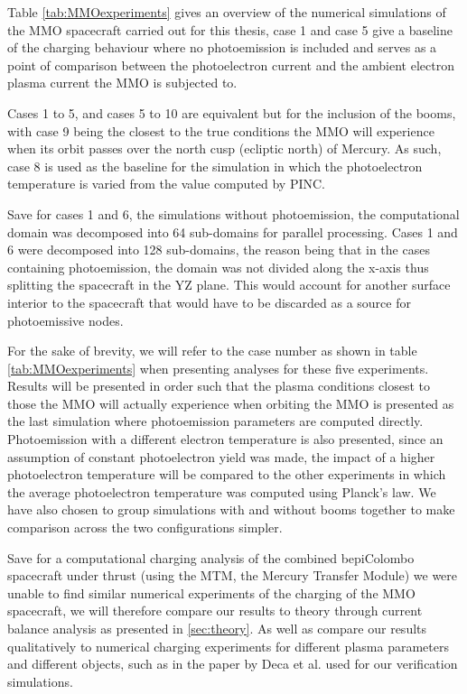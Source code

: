 Table \ref{tab:MMOexperiments} gives an overview of the numerical simulations of the MMO spacecraft carried out for this thesis, case 1 and case 5 give a baseline of the charging behaviour where no photoemission is included and serves as a point of comparison between the photoelectron current and the ambient electron plasma current the MMO is subjected to. 

Cases 1 to 5, and cases 5 to 10 are equivalent but for the inclusion of the booms, with case 9 being the closest to the true conditions the MMO will experience when its orbit passes over the north cusp (ecliptic north) of Mercury. As such, case 8 is used as the baseline for the simulation in which the photoelectron temperature is varied from the value computed by PINC.

Save for cases 1 and 6, the simulations without photoemission, the computational domain was decomposed into 64 sub-domains for parallel processing. Cases 1 and 6 were decomposed into 128 sub-domains, the reason being that in the cases containing photoemission, the domain was not divided along the x-axis thus splitting the spacecraft in the YZ plane. This would account for another surface interior to the spacecraft that would have to be discarded as a source for photoemissive nodes.

For the sake of brevity, we will refer to the case number as shown in table \ref{tab:MMOexperiments} when presenting analyses for these five experiments. Results will be presented in order such that the plasma conditions closest to those the MMO will actually experience when orbiting the MMO is presented as the last simulation where photoemission parameters are computed directly. Photoemission with a different electron temperature is also presented, since an assumption of constant photoelectron yield was made, the impact of a higher photoelectron temperature will be compared to the other experiments in which the average photoelectron temperature was computed using Planck's law. We have also chosen to group simulations with and without booms together to make comparison across the two configurations simpler.

Save for a computational charging analysis of the combined bepiColombo spacecraft under thrust (using the MTM, the Mercury Transfer Module)  we were unable to find similar numerical experiments of the charging of the MMO spacecraft, we will therefore compare our results to theory through current balance analysis as presented in \ref{sec:theory}. As well as compare our results qualitatively to numerical charging experiments for different plasma parameters and different objects, such as in the paper by Deca et al. \parencite{Deca2013} used for our verification simulations.

